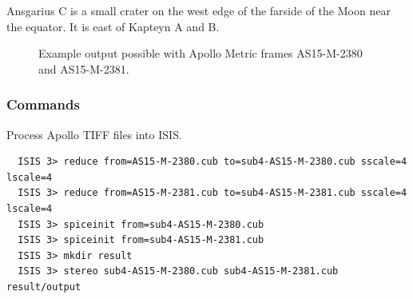 Ansgarius C is a small crater on the west edge of the farside of the
Moon near the equator. It is east of Kapteyn A and B.

\begin{figure}[h!]
\centering
  \hfil
\caption{Example output possible with Apollo Metric frames AS15-M-2380 and AS15-M-2381.}
\label{fig:metric_example}
\end{figure}

\subsubsection*{Commands}

Process Apollo TIFF files into \ac{ISIS}.
\begin{verbatim}
  ISIS 3> reduce from=AS15-M-2380.cub to=sub4-AS15-M-2380.cub sscale=4 lscale=4
  ISIS 3> reduce from=AS15-M-2381.cub to=sub4-AS15-M-2381.cub sscale=4 lscale=4
  ISIS 3> spiceinit from=sub4-AS15-M-2380.cub
  ISIS 3> spiceinit from=sub4-AS15-M-2381.cub
  ISIS 3> mkdir result
  ISIS 3> stereo sub4-AS15-M-2380.cub sub4-AS15-M-2381.cub result/output
\end{verbatim}

